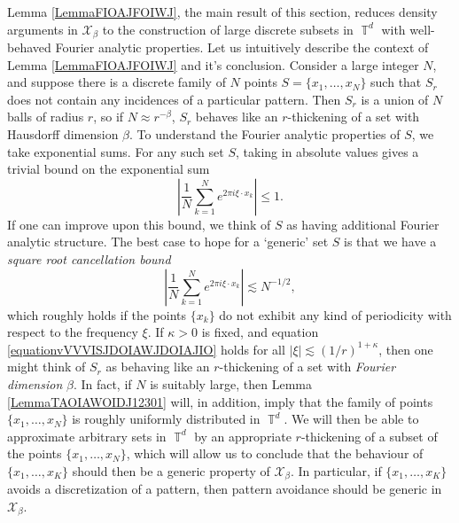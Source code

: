 \documentclass[dvipsnames,letterpaper,12pt]{article}
\numberwithin{equation}{section}
\DeclareMathOperator{\TT}{\mathbb{T}}
\numberwithin{theorem}{section}
\begin{document}
Lemma \ref{LemmaFIOAJFOIWJ}, the main result of this section, reduces density arguments in $\mathcal{X}_\beta$ to the construction of large discrete subsets in $\TT^d$ with well-behaved Fourier analytic properties. Let us intuitively describe the context of Lemma \ref{LemmaFIOAJFOIWJ} and it's conclusion. Consider a large integer $N$, and suppose there is a discrete family of $N$ points $S = \{ x_1, \dots, x_N \}$ such that $S_r$ does not contain any incidences of a particular pattern. Then $S_r$ is a union of $N$ balls of radius $r$, so if $N \approx r^{-\beta}$, $S_r$ behaves like an $r$-thickening of a set with Hausdorff dimension $\beta$. To understand the Fourier analytic properties of $S$, we take exponential sums. For any such set $S$, taking in absolute values gives a trivial bound on the exponential sum
%
\begin{equation}
    \left| \frac{1}{N} \sum_{k = 1}^N e^{2 \pi i \xi \cdot x_k} \right| \leq 1.
\end{equation}
%
If one can improve upon this bound, we think of $S$ as having additional Fourier analytic structure. The best case to hope for a `generic' set $S$ is that we have a \emph{square root cancellation bound}
%
\begin{equation} \label{equationvVVVISJDOIAWJDOIAJIO}
    \left| \frac{1}{N} \sum_{k = 1}^N e^{2 \pi i \xi \cdot x_k} \right| \lesssim N^{-1/2},
\end{equation}
%
which roughly holds if the points $\{ x_k \}$ do not exhibit any kind of periodicity with respect to the frequency $\xi$. If $\kappa > 0$ is fixed, and equation \eqref{equationvVVVISJDOIAWJDOIAJIO} holds for all $|\xi| \lesssim (1/r)^{1 + \kappa}$, then one might think of $S_r$ as behaving like an $r$-thickening of a set with \emph{Fourier dimension} $\beta$. In fact, if $N$ is suitably large, then Lemma \ref{LemmaTAOIAWOIDJ12301} will, in addition, imply that the family of points $\{ x_1, \dots, x_N \}$ is roughly uniformly distributed in $\TT^d$. We will then be able to approximate arbitrary sets in $\TT^d$ by an appropriate $r$-thickening of a subset of the points $\{ x_1, \dots, x_N \}$, which will allow us to conclude that the behaviour of $\{ x_1, \dots, x_K \}$ should then be a generic property of $\mathcal{X}_\beta$. In particular, if $\{ x_1, \dots, x_K \}$ avoids a discretization of a pattern, then pattern avoidance should be generic in $\mathcal{X}_\beta$.
\end{document}
